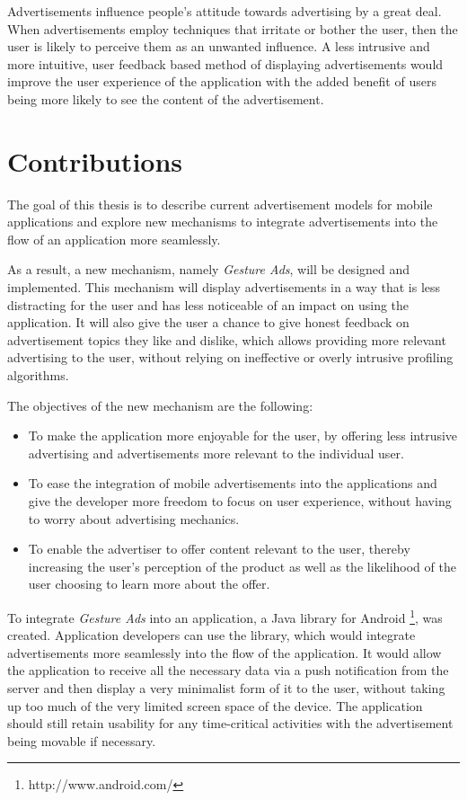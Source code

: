 Advertisements influence people's attitude towards advertising by a great deal. When advertisements employ techniques that irritate or bother the user, then the user is likely to perceive them as an unwanted influence.\cite{chowdhury2010consumer} A less intrusive and more intuitive, user feedback based method of displaying advertisements would improve the user experience of the application with the added benefit of users being more likely to see the content of the advertisement.

\section{Contributions}
The goal of this thesis is to describe current advertisement models for mobile applications and explore new mechanisms to integrate advertisements into the flow of an application more seamlessly.

As a result, a new mechanism, namely \textit{Gesture Ads}, will be designed and implemented. This mechanism will display advertisements in a way that is less distracting for the user and has less noticeable of an impact on using the application. It will also give the user a chance to give honest feedback on advertisement topics they like and dislike, which allows providing more relevant advertising to the user, without relying on ineffective or overly intrusive profiling algorithms\cite{dontkillmyads}.

The objectives of the new mechanism are the following:
\begin{itemize}
  \item To make the application more enjoyable for the user, by offering less intrusive advertising and advertisements more relevant to the individual user.
  \item To ease the integration of mobile advertisements into the applications and give the developer more freedom to focus on user experience, without having to worry about advertising mechanics.
  \item To enable the advertiser to offer content relevant to the user, thereby increasing the user's perception of the product as well as the likelihood of the user choosing to learn more about the offer.
\end{itemize}

To integrate \textit{Gesture Ads} into an application, a Java library for Android \footnote{http://www.android.com/}, was created. Application developers can use the library, which would integrate advertisements more seamlessly into the flow of the application. It would allow the application to receive all the necessary data via a push notification from the server and then display a very minimalist form of it to the user, without taking up too much of the very limited screen space of the device. The application should still retain usability for any time-critical activities with the advertisement being movable if necessary.

